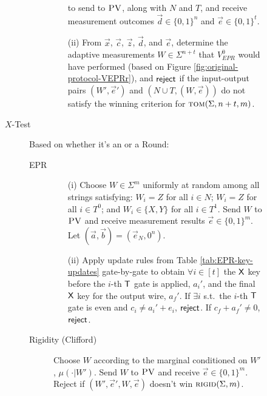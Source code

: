 \documentclass[11pt,letter]{article}
\theoremstyle{remark}
\theoremstyle{definition}
\newcommand{\rigid}{\textsc{rigid}}
\newcommand{\tom}{\textsc{tom}}
\newcommand{\pv}{\textsc{PV}}
\newcommand{\snote}[1]{\textcolor{green}{\small {\textbf{(Stacey:} #1 \textbf{) }}}}
\begin{document}
\begin{figure}[H]
\begin{description}
\begin{description}
\begin{enumerate}
		to send to $\pv$, along with $N$ and $T$, and receive measurement outcomes $\vec{d}\in \{0,1\}^n$ and $\vec{e}\in\{0,1\}^t$. 
		\item[(ii)]
		From $\vec{x}$, $\vec{c}$, $\vec{z}$, $\vec{d}$, and $\vec{e}$, determine the adaptive measurements $W\in\Sigma^{n+t}$ that $V_{EPR}^0$ would have performed (based on Figure \ref{fig:original-protocol-VEPRr}), and $\sf reject$ if the input-output pairs $(W',\vec{e}')$ and $(N\cup T,(W,\vec{e}))$ do not satisfy the winning criterion for $\tom(\Sigma,n+t,m)$.
		\end{enumerate}
	\end{description}
\item[$X$-Test] Based on whether it's an  or a  Round:
\begin{description}
	\item[EPR] 
	\begin{enumerate}
		\item[(i)] Choose $W\in\Sigma^m$ uniformly at random among all strings satisfying: $W_i=Z$ for all $i\in N$; $W_i=Z$ for all $i\in T^0$; and $W_i\in\{X,Y\}$ for all $i\in T^1$. Send $W$ to $\pv$ and receive measurement results $\vec{e}\in\{0,1\}^m$. Let $(\vec{a},\vec{b})=(\vec{e}_N,0^n)$. 
		\item[(ii)] Apply update rules from Table \ref{tab:EPR-key-updates} gate-by-gate to obtain $\forall i\in [t]$ the $\sf X$ key before the $i$-th $\sf T$ gate is applied, $a_i'$, and the final $\sf X$ key for the output wire, $a_f'$. 
If $\exists i$ s.t.\ the $i$-th $\sf T$ gate is even and $c_i\neq a_i'+e_i$, $\sf reject$. If $c_f+a_f'\neq 0$, $\sf reject$. %
	\end{enumerate}
	\item[Rigidity (Clifford)] Choose ${W}$ according to the marginal conditioned on ${W}'$, $\mu(\cdot|{W}')$. %
	Send ${W}$ to $\pv$ and receive $\vec{e}\in\{0,1\}^m$. Reject if   $({W}',\vec{e}',{W},\vec{e})$ doesn't win $\rigid(\Sigma,m)$. 
\end{description}


\end{description}
\end{figure}
\end{document}
